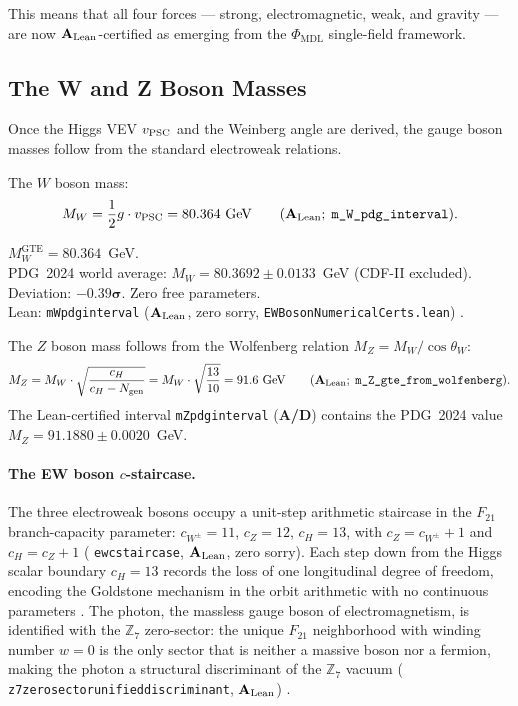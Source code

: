 \documentclass[11pt,openany]{book}
\theoremstyle{remark}
\newcommand{\GTE}{\text{GTE}}
\newcommand{\PHIMDL}{\Phi_{\mathrm{MDL}}}
\newcommand{\lean}[1]{%
  \penalty-100
  \begingroup\def\_{\textunderscore\allowbreak}\texttt{#1}\endgroup}
\newcommand{\Ngen}{N_{\rm gen}}
\newcommand{\CatAL}{\ensuremath{\textbf{A}_{\rm Lean}}}
\newcommand{\CatAD}{\textbf{A/D}}
\begin{document}
This means that all four forces --- strong, electromagnetic, weak, and gravity --- are now
\CatAL{}-certified as emerging from the $\PHIMDL$ single-field framework.

\subsection*{The W and Z Boson Masses}

Once the Higgs VEV $v_{\rm PSC}$ and the Weinberg angle are derived, the gauge boson
masses follow from the standard electroweak relations.

The $W$ boson mass:
\begin{equation}
  M_W = \frac{1}{2} g \cdot v_{\rm PSC}
  = 80.364~\text{GeV} \qquad
  (\CatAL;\;\lean{m\_W\_pdg\_interval}).
  \label{eq:MW}
\end{equation}

\begin{tcolorbox}[colback=orange!5,colframe=orange!60,title={Result: $W$ Boson Mass (\CatAL)}]
$M_W^{\GTE} = 80.364$~GeV.\\[2pt]
PDG~2024 world average: $M_W = 80.3692 \pm 0.0133$~GeV (CDF-II excluded).\\[2pt]
Deviation: $\mathbf{-0.39\sigma}$.  Zero free parameters.\\[2pt]
Lean: \lean{m\_W\_pdg\_interval} (\CatAL, zero sorry, \lean{EWBosonNumericalCerts.lean})
\cite{SpivackGTEUnification}.
\end{tcolorbox}

The $Z$ boson mass follows from the Wolfenberg relation $M_Z = M_W / \cos\theta_W$:
\begin{equation}
  M_Z = M_W \cdot \sqrt{\frac{c_H}{c_H - \Ngen}}
  = M_W \cdot \sqrt{\frac{13}{10}}
  = 91.6~\text{GeV} \qquad
  (\CatAL;\;\lean{m\_Z\_gte\_from\_wolfenberg}).
  \label{eq:MZ}
\end{equation}
The Lean-certified interval \lean{m\_Z\_pdg\_interval} (\CatAD) contains the
PDG~2024 value $M_Z = 91.1880 \pm 0.0020$~GeV.

\paragraph{The EW boson $c$-staircase.}
The three electroweak bosons occupy a unit-step arithmetic staircase in the $F_{21}$
branch-capacity parameter: $c_{W^\pm} = 11$, $c_Z = 12$, $c_H = 13$, with $c_Z =
c_{W^\pm}+1$ and $c_H = c_Z + 1$ (\lean{ew\_c\_staircase}, \CatAL, zero sorry).
Each step down from the Higgs scalar boundary $c_H = 13$ records the loss of one
longitudinal degree of freedom, encoding the Goldstone mechanism in the orbit
arithmetic with no continuous parameters \cite{SpivackDeeperConsequences}.
The photon, the massless gauge boson of electromagnetism, is identified with the
$\mathbb{Z}_7$ zero-sector: the unique $F_{21}$ neighborhood with winding number
$w = 0$ is the only sector that is neither a massive boson nor a fermion, making
the photon a structural discriminant of the $\mathbb{Z}_7$ vacuum
(\lean{z7\_zero\_sector\_unified\_discriminant}, \CatAL)
\cite{SpivackDeeperConsequences}.
\end{document}
